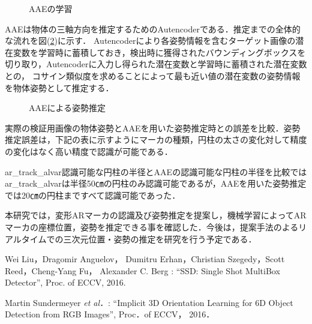 \documentclass{jsarticle}
\begin{document}
\begin{figure}[ht]
\vspace{-5zh}
\setlength{\epsfxsize}{7.5cm}
\centerline{}
\vspace{5zh}
\caption{AAEの学習}
\label{BB}
\vspace{-1.0zh}
\end{figure}




AAEは物体の三軸方向を推定するためのAutencoderである．推定までの全体的な流れを図(\ref{GG})に示す．
Autencoderにより各姿勢情報を含むターゲット画像の潜在変数を学習時に蓄積しておき，検出時に獲得されたバウンディングボックスを切り取り，Autencoderに入力し得られた潜在変数と学習時に蓄積された潜在変数との，
コサイン類似度を求めることによって最も近い値の潜在変数の姿勢情報を物体姿勢として推定する．

\begin{figure}[ht]
\vspace{-5zh}
\setlength{\epsfxsize}{7.5cm}
\centerline{}
\vspace{5zh}
\caption{AAEによる姿勢推定}
\label{GG}
\vspace{-1.0zh}
\end{figure}




実際の検証用画像の物体姿勢とAAEを用いた姿勢推定時との誤差を比較．姿勢推定誤差は，下記の表に示すようにマーカの種類，円柱の太さの変化対して精度の変化はなく高い精度で認識が可能である．

ar\_track\_alvar認識可能な円柱の半径とAAEの認識可能な円柱の半径を比較ではar\_track\_alvarは半径50㎝の円柱のみ認識可能であるが，AAEを用いた姿勢推定では20㎝の円柱まですべて認識可能であった．


本研究では，変形ARマーカの認識及び姿勢推定を提案し，機械学習によってARマーカの座標位置，姿勢を推定できる事を確認した．今後は，提案手法のよるリアルタイムでの三次元位置・姿勢の推定を研究を行う予定である．

%
%
%

\begin{thebibliography}{1}
{\scriptsize 
{}
Wei Liu，Dragomir Anguelov， Dumitru Erhan，Christian Szegedy，Scott Reed，Cheng-Yang Fu， Alexander C. Berg : ``SSD: Single Shot MultiBox Detector'', Proc. of ECCV, 2016.}

{\scriptsize 
{}
Martin Sundermeyer {\em et al．}: ``Implicit 3D Orientation Learning for 6D Object Detection from RGB Images'', 
Proc．of ECCV， 2016．}

\end{thebibliography}
\end{document}
